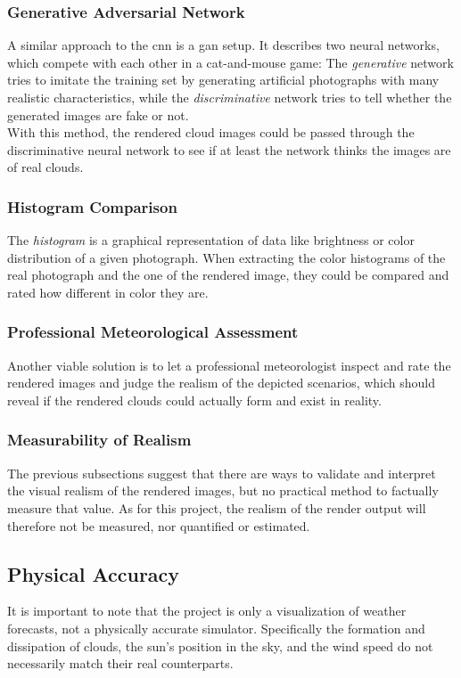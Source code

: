 \subsubsection{Generative Adversarial Network}
A similar approach to the \gls{cnn} is a \gls{gan} setup. It describes two neural networks, which compete with each other in a cat-and-mouse game: The \textit{generative} network tries to imitate the training set by generating artificial photographs with many realistic characteristics, while the \emph{discriminative} network tries to tell whether the generated images are fake or not.
\\
With this method, the rendered cloud images could be passed through the discriminative neural network to see if at least the network thinks the images are of real clouds.

\subsubsection{Histogram Comparison}
The \textit{\gls{histogram}} is a graphical representation of data like brightness or color distribution of a given photograph.
When extracting the color \gls{histogram}s of the real photograph and the one of the rendered image, they could be compared and rated how different in color they are.

\subsubsection{Professional Meteorological Assessment}
Another viable solution is to let a professional meteorologist inspect and rate the rendered images and judge the realism of the depicted scenarios, which should reveal if the rendered clouds could actually form and exist in reality.

\subsubsection{Measurability of Realism}
\label{section:eval:measurability}
The previous subsections suggest that there are ways to validate and interpret the visual realism of the rendered images, but no practical method to factually measure that value.
As for this project, the realism of the render output will therefore not be measured, nor quantified or estimated.

\subsection{Physical Accuracy}
It is important to note that the project is only a visualization of weather forecasts, not a physically accurate simulator.
Specifically the formation and dissipation of clouds, the sun's position in the sky, and the wind speed do not necessarily match their real counterparts.

